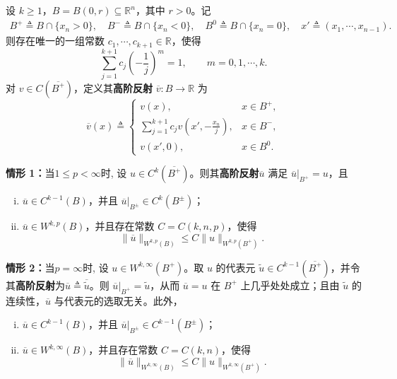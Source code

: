 \documentclass[../../main.tex]{subfiles}
\begin{document}
\begin{lemma}[半空间上的高阶反射]\label{lemma:ch05-高阶反射}
设 $k\geqslant1$，$B=B(0,r)\subseteq\mathbb{R}^{n}$，其中 $r>0$。记
\begin{align*}
B^{+}\triangleq B\cap\{x_n>0\},\quad
B^{-}\triangleq B\cap\{x_n<0\},\quad
B^{0}\triangleq B\cap\{x_n=0\},\quad
x'\triangleq(x_1,\cdots,x_{n-1}).
\end{align*}
则存在唯一的一组常数 $c_1,\cdots,c_{k+1}\in\mathbb{R}$，使得
\begin{equation}
\sum_{j=1}^{k+1}c_j\left(-\frac{1}{j}\right)^{m}=1,\qquad m=0,1,\cdots,k.
\label{eq:ch05-反射矩条件}
\end{equation}
对 $v\in C(\overline{B^{+}})$，定义其\textbf{高阶反射} $\overline{v}:B\to\mathbb{R}$ 为
\begin{equation}
\overline{v}(x)\triangleq
\begin{cases}
v(x), & x\in B^{+},\\[1ex]
\displaystyle\sum_{j=1}^{k+1}c_jv\left(x',-\frac{x_n}{j}\right), & x\in B^{-},\\[1ex]
v(x',0), & x\in B^{0}.
\end{cases}
\label{align:ch05-高阶反射}
\end{equation}

\medskip
\noindent\textbf{情形 1：}当$1\leqslant p<\infty$时,
设 $u\in C^{k}(\overline{B^{+}})$。则其\textbf{高阶反射}$\overline{u}$ 满足 $\overline{u}|_{B^{+}}=u$，且
\begin{enumerate}[(i)]
\item $\overline{u}\in C^{k-1}(B)$，并且 $\overline{u}|_{B^{\pm}}\in C^{k}(B^{\pm})$；
\item $\overline{u}\in W^{k,p}(B)$，并且存在常数 $C=C(k,n,p)$，使得
\begin{equation}
\|\overline{u}\|_{W^{k,p}(B)}
\leqslant C\|u\|_{W^{k,p}(B^{+})}.
\label{eq:ch05-反射估计}
\end{equation}
\end{enumerate}

\medskip
\noindent\textbf{情形 2：}当$p=\infty$时,
设 $u\in W^{k,\infty}(B^{+})$。取 $u$ 的代表元 $\widetilde{u}\in C^{k-1}(\overline{B^{+}})$，并令其\textbf{高阶反射}为$\overline{u}\triangleq\overline{\widetilde{u}}$。则 $\overline{u}|_{B^{+}}=\widetilde{u}$，从而 $\overline{u}=u$ 在 $B^{+}$ 上几乎处处成立；且由 $\widetilde{u}$ 的连续性，$\overline{u}$ 与代表元的选取无关。此外，
\begin{enumerate}[(i)]
\item $\overline{u}\in C^{k-1}(B)$，并且 $\overline{u}|_{B^{\pm}}\in C^{k-1}(B^{\pm})$；
\item $\overline{u}\in W^{k,\infty}(B)$，并且存在常数 $C=C(k,n)$，使得
\begin{equation}
\|\overline{u}\|_{W^{k,\infty}(B)}
\leqslant C\|u\|_{W^{k,\infty}(B^{+})}.
\label{eq:ch05-反射估计-pinfty}
\end{equation}
\end{enumerate}
\end{lemma}
\end{document}
